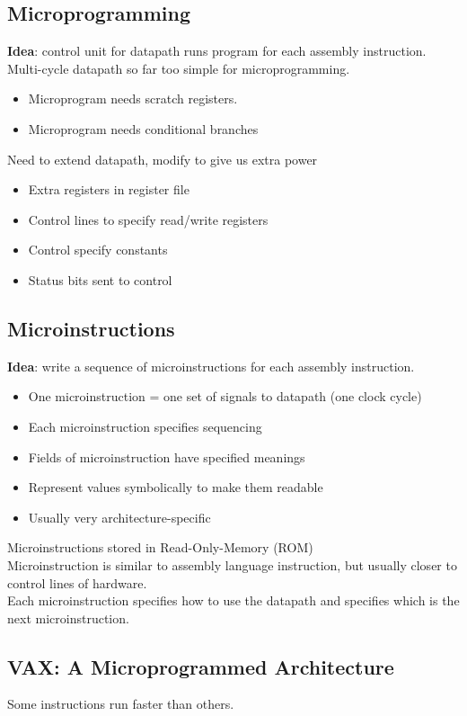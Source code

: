 \documentclass[12pt]{article}
\theoremstyle{definition}
\begin{document}
  \subsection{Microprogramming}
  \textbf{Idea}: control unit for datapath runs program for each assembly instruction. \\
  Multi-cycle datapath so far too simple for microprogramming.
  \begin{itemize}
    \item Microprogram needs scratch registers.
    \item Microprogram needs conditional branches
  \end{itemize}
  Need to extend datapath, modify to give us extra power
  \begin{itemize}
    \item Extra registers in register file
    \item Control lines to specify read/write registers
    \item Control specify constants
    \item Status bits sent to control
  \end{itemize}

  \subsection{Microinstructions}
  \textbf{Idea}: write a sequence of microinstructions for each assembly instruction.
  \begin{itemize}
    \item One microinstruction = one set of signals to datapath (one clock cycle)
    \item Each microinstruction specifies sequencing
    \item Fields of microinstruction have specified meanings
    \item Represent values symbolically to make them readable
    \item Usually very architecture-specific
  \end{itemize}
  Microinstructions stored in Read-Only-Memory (ROM) \\
  Microinstruction is similar to assembly language instruction, but usually closer to control lines of hardware. \\
  Each microinstruction specifies how to use the datapath and specifies which is the next microinstruction. \\

  \subsection{VAX: A Microprogrammed Architecture}
  Some instructions run faster than others. \\
\end{document}

